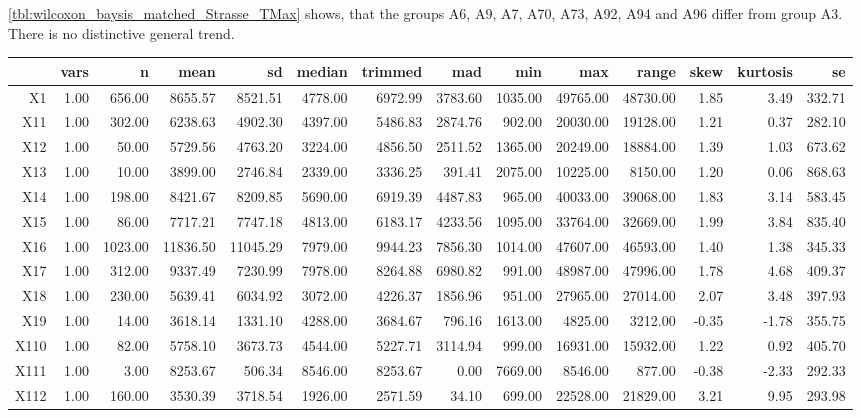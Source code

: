 \cref{tbl:wilcoxon_baysis_matched_Strasse_TMax} shows, that the groups A6, A9, A7, A70, A73, A92, A94 and A96 differ from group A3. There is no distinctive general trend.
\begin{table}[ht!]
	\tiny
	\centering
  \begin{tabular}{rrrrrrrrrrrrrr}
    \hline
   & vars & n & mean & sd & median & trimmed & mad & min & max & range & skew & kurtosis & se \\ 
    \hline
  X1 & 1.00 & 656.00 & 8655.57 & 8521.51 & 4778.00 & 6972.99 & 3783.60 & 1035.00 & 49765.00 & 48730.00 & 1.85 & 3.49 & 332.71 \\ 
    X11 & 1.00 & 302.00 & 6238.63 & 4902.30 & 4397.00 & 5486.83 & 2874.76 & 902.00 & 20030.00 & 19128.00 & 1.21 & 0.37 & 282.10 \\ 
    X12 & 1.00 & 50.00 & 5729.56 & 4763.20 & 3224.00 & 4856.50 & 2511.52 & 1365.00 & 20249.00 & 18884.00 & 1.39 & 1.03 & 673.62 \\ 
    X13 & 1.00 & 10.00 & 3899.00 & 2746.84 & 2339.00 & 3336.25 & 391.41 & 2075.00 & 10225.00 & 8150.00 & 1.20 & 0.06 & 868.63 \\ 
    X14 & 1.00 & 198.00 & 8421.67 & 8209.85 & 5690.00 & 6919.39 & 4487.83 & 965.00 & 40033.00 & 39068.00 & 1.83 & 3.14 & 583.45 \\ 
    X15 & 1.00 & 86.00 & 7717.21 & 7747.18 & 4813.00 & 6183.17 & 4233.56 & 1095.00 & 33764.00 & 32669.00 & 1.99 & 3.84 & 835.40 \\ 
    X16 & 1.00 & 1023.00 & 11836.50 & 11045.29 & 7979.00 & 9944.23 & 7856.30 & 1014.00 & 47607.00 & 46593.00 & 1.40 & 1.38 & 345.33 \\ 
    X17 & 1.00 & 312.00 & 9337.49 & 7230.99 & 7978.00 & 8264.88 & 6980.82 & 991.00 & 48987.00 & 47996.00 & 1.78 & 4.68 & 409.37 \\ 
    X18 & 1.00 & 230.00 & 5639.41 & 6034.92 & 3072.00 & 4226.37 & 1856.96 & 951.00 & 27965.00 & 27014.00 & 2.07 & 3.48 & 397.93 \\ 
    X19 & 1.00 & 14.00 & 3618.14 & 1331.10 & 4288.00 & 3684.67 & 796.16 & 1613.00 & 4825.00 & 3212.00 & -0.35 & -1.78 & 355.75 \\ 
    X110 & 1.00 & 82.00 & 5758.10 & 3673.73 & 4544.00 & 5227.71 & 3114.94 & 999.00 & 16931.00 & 15932.00 & 1.22 & 0.92 & 405.70 \\ 
    X111 & 1.00 & 3.00 & 8253.67 & 506.34 & 8546.00 & 8253.67 & 0.00 & 7669.00 & 8546.00 & 877.00 & -0.38 & -2.33 & 292.33 \\ 
    X112 & 1.00 & 160.00 & 3530.39 & 3718.54 & 1926.00 & 2571.59 & 34.10 & 699.00 & 22528.00 & 21829.00 & 3.21 & 9.95 & 293.98 \\ 

\end{tabular}
\end{table}
